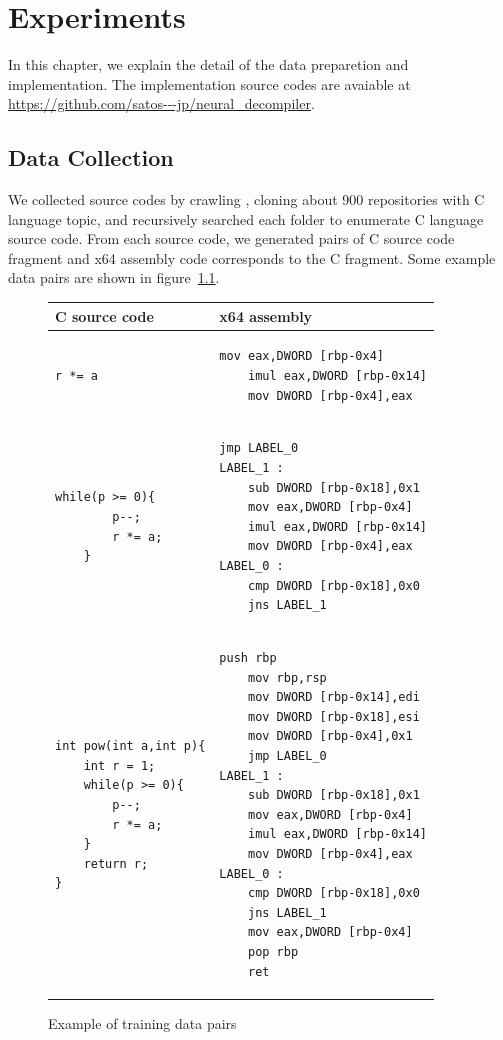 \documentclass[senior,final,11pt]{iscs-thesis}
\begin{document}
\chapter{Experiments}
In this chapter, we explain the detail of the data preparetion and implementation.
The implementation source codes are avaiable at \url{https://github.com/satos---jp/neural_decompiler}.  

\section{Data Collection}
We collected source codes by crawling \cite[GitHub]{github}, cloning about 900 repositories with C language topic, 
and recursively searched each folder to enumerate C language source code.
From each source code, we generated pairs of C source code fragment and x64 assembly code corresponds to the C fragment.
Some example data pairs are shown in figure~\ref{fig:pairsoffragments}. 

\begin{figure}
	\begin{tabular}{|l|l|} \hline
	 C source code & x64 assembly \\ \hline 
		\begin{lstlisting}[style=Csample]
		r *= a
		\end{lstlisting}
		&
		\begin{lstlisting}[style=Asmsample]
	mov eax,DWORD [rbp-0x4]
	imul eax,DWORD [rbp-0x14]
	mov DWORD [rbp-0x4],eax
		\end{lstlisting} \\ \hline	
		\begin{lstlisting}[style=Csample]
	while(p >= 0){
		p--;
		r *= a;
	}
		\end{lstlisting}
		&
		\begin{lstlisting}[style=Asmsample]
	jmp LABEL_0
LABEL_1 :
	sub DWORD [rbp-0x18],0x1
	mov eax,DWORD [rbp-0x4]
	imul eax,DWORD [rbp-0x14]
	mov DWORD [rbp-0x4],eax
LABEL_0 :
	cmp DWORD [rbp-0x18],0x0
	jns LABEL_1
		\end{lstlisting} \\ \hline		
		\begin{lstlisting}[style=Csample]
int pow(int a,int p){
	int r = 1;
	while(p >= 0){
		p--;
		r *= a;
	}
	return r;
}
		\end{lstlisting}
		&
		\begin{lstlisting}[style=Asmsample]
	push rbp
	mov rbp,rsp
	mov DWORD [rbp-0x14],edi
	mov DWORD [rbp-0x18],esi
	mov DWORD [rbp-0x4],0x1
	jmp LABEL_0
LABEL_1 :
	sub DWORD [rbp-0x18],0x1
	mov eax,DWORD [rbp-0x4]
	imul eax,DWORD [rbp-0x14]
	mov DWORD [rbp-0x4],eax
LABEL_0 :
	cmp DWORD [rbp-0x18],0x0
	jns LABEL_1
	mov eax,DWORD [rbp-0x4]
	pop rbp
	ret
		\end{lstlisting} \\ \hline
	\end{tabular}
	\caption{Example of training data pairs}
	\label{fig:pairsoffragments}
\end{figure}
\end{document}
